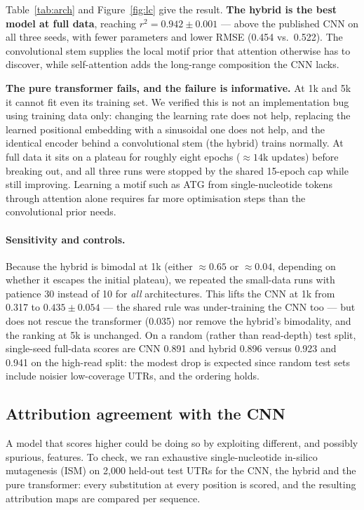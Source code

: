 \documentclass{article}
\begin{document}
Table~\ref{tab:arch} and Figure~\ref{fig:lc} give the result. \textbf{The hybrid is the best
model at full data}, reaching $r^2 = 0.942 \pm 0.001$ --- above the published CNN on all
three seeds, with fewer parameters and lower RMSE (0.454 vs.\ 0.522). The convolutional stem
supplies the local motif prior that attention otherwise has to discover, while self-attention
adds the long-range composition the CNN lacks.

\textbf{The pure transformer fails, and the failure is informative.} At 1k and 5k it cannot
fit even its training set. We verified this is not an implementation bug using training data
only: changing the learning rate does not help, replacing the learned positional embedding
with a sinusoidal one does not help, and the identical encoder behind a convolutional stem
(the hybrid) trains normally. At full data it sits on a plateau for roughly eight epochs
($\approx14$k updates) before breaking out, and all three runs were stopped by the shared
15-epoch cap while still improving. Learning a motif such as ATG from single-nucleotide
tokens through attention alone requires far more optimisation steps than the convolutional
prior needs.

\paragraph{Sensitivity and controls.} Because the hybrid is bimodal at 1k (either
$\approx0.65$ or $\approx0.04$, depending on whether it escapes the initial plateau), we
repeated the small-data runs with patience 30 instead of 10 for \emph{all} architectures.
This lifts the CNN at 1k from 0.317 to $0.435 \pm 0.054$ --- the shared rule was
under-training the CNN too --- but does not rescue the transformer (0.035) nor remove the
hybrid's bimodality, and the ranking at 5k is unchanged. On a random (rather than
read-depth) test split, single-seed full-data scores are CNN 0.891 and hybrid 0.896 versus
0.923 and 0.941 on the high-read split: the modest drop is expected since random test sets
include noisier low-coverage UTRs, and the ordering holds.

\subsection{Attribution agreement with the CNN}
\label{sec:ism}

A model that scores higher could be doing so by exploiting different, and possibly spurious,
features. To check, we ran exhaustive single-nucleotide in-silico mutagenesis (ISM) on
2{,}000 held-out test UTRs for the CNN, the hybrid and the pure transformer: every
substitution at every position is scored, and the resulting attribution maps are compared
per sequence.
\end{document}
